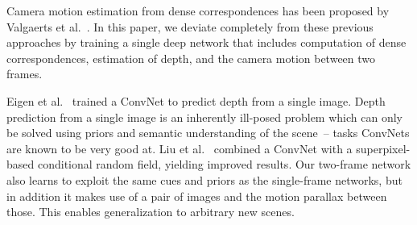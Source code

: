 \documentclass[10pt,twocolumn,letterpaper]{article}
\begin{document}
Camera motion estimation from dense correspondences has been proposed by Valgaerts et al.~\cite{valgaerts_dense_2012}. 
In this paper, we deviate completely from these previous approaches by training a single deep network that includes computation of dense correspondences, estimation of depth, and the camera motion between two frames. 

Eigen et al.~\cite{eigen_predicting_2015} trained a ConvNet to predict depth from a single image.
Depth prediction from a single image is an inherently ill-posed problem which can only be solved using priors and semantic understanding of the scene~-- tasks ConvNets are known to be very good at.
Liu et al.~\cite{liu_learning_2015} combined a ConvNet with a superpixel-based conditional random field, yielding improved results.
Our two-frame network also learns to exploit the same cues and priors as the single-frame networks, but in addition it makes use of a pair of images and the motion parallax between those. 
This enables generalization to arbitrary new scenes. 
\end{document}
